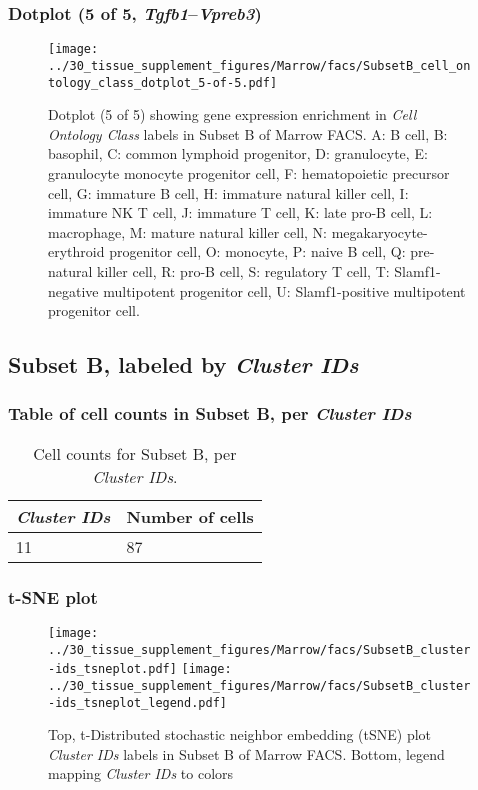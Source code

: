 \subsubsection{Dotplot (5 of 5, \emph{Tgfb1}--\emph{Vpreb3})}
\begin{figure}[h]
\centering
\texttt{[image: ../30\_tissue\_supplement\_figures/Marrow/facs/SubsetB\_cell\_ontology\_class\_dotplot\_5-of-5.pdf]}

\caption{ Dotplot (5 of 5)  showing gene expression enrichment in \emph{Cell Ontology Class} labels in Subset B of Marrow FACS. A: B cell, B: basophil, C: common lymphoid progenitor, D: granulocyte, E: granulocyte monocyte progenitor cell, F: hematopoietic precursor cell, G: immature B cell, H: immature natural killer cell, I: immature NK T cell, J: immature T cell, K: late pro-B cell, L: macrophage, M: mature natural killer cell, N: megakaryocyte-erythroid progenitor cell, O: monocyte, P: naive B cell, Q: pre-natural killer cell, R: pro-B cell, S: regulatory T cell, T: Slamf1-negative multipotent progenitor cell, U: Slamf1-positive multipotent progenitor cell.}
\end{figure}


\clearpage

\subsection{Subset B, labeled by \emph{Cluster IDs}}
\subsubsection{Table of cell counts in Subset B, per \emph{Cluster IDs}}\begin{table}[h]
\centering
\label{my-label}
\begin{tabular}{@{}ll@{}}
\toprule

\emph{Cluster IDs}& Number of cells \\ \midrule
11 & 87 \\
\bottomrule
\end{tabular}
\caption{Cell counts for Subset B, per \emph{Cluster IDs}.}
\end{table}

\clearpage
\subsubsection{t-SNE plot}
\begin{figure}[h]
\centering
\texttt{[image: ../30\_tissue\_supplement\_figures/Marrow/facs/SubsetB\_cluster-ids\_tsneplot.pdf]}
\texttt{[image: ../30\_tissue\_supplement\_figures/Marrow/facs/SubsetB\_cluster-ids\_tsneplot\_legend.pdf]}
\caption{Top, t-Distributed stochastic neighbor embedding (tSNE) plot  \emph{Cluster IDs} labels in Subset B of Marrow FACS. Bottom, legend mapping \emph{Cluster IDs} to colors}
\end{figure}


